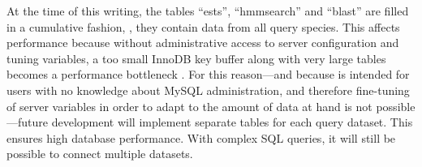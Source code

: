 At the time of this writing, the tables ``ests'', ``hmmsearch'' and ``blast''
are filled in a cumulative fashion, \ie, they contain data from all query
species. This affects performance because without administrative access to
server configuration and tuning variables, a too small InnoDB key buffer along
with very large tables becomes a performance bottleneck \citep{mysql2013}. For
this reason---and because \pname is intended for users with no knowledge about
MySQL administration, and therefore fine-tuning of server variables in order to
adapt to the amount of data at hand is not possible---future development will
implement separate tables for each query dataset. This ensures high database
performance. With complex SQL queries, it will still be possible to connect
multiple datasets.

